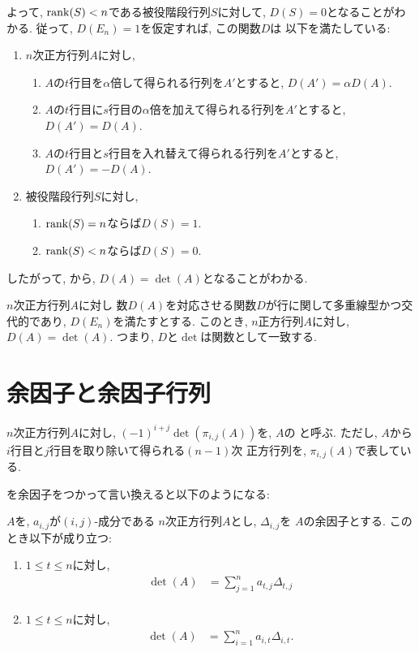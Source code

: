 よって, $\operatorname{rank}(S)<n$である被役階段行列$S$に対して, $D(S)=0$となることがわかる.
従って, $D(E_n)=1$を仮定すれば, この関数$D$は
以下を満たしている:
\begin{enumerate}
  \item $n$次正方行列$A$に対し,
  \begin{enumerate}
  \item 
    $A$の$t$行目を$\alpha$倍して得られる行列を$A'$とすると,
    $D(A')=\alpha D(A)$.
  \item 
    $A$の$t$行目に$s$行目の$\alpha$倍を加えて得られる行列を$A'$とすると,
    $D(A')=D(A)$.
  \item 
    $A$の$t$行目と$s$行目を入れ替えて得られる行列を$A'$とすると,
    $D(A')=-D(A)$.
  \end{enumerate}
  \item 被役階段行列$S$に対し,
  \begin{enumerate}
  \item $\operatorname{rank}(S)=n$ならば$D(S)=1$.
  \item $\operatorname{rank}(S)<n$ならば$D(S)=0$.
  \end{enumerate}
\end{enumerate}
したがって,
から, $D(A)=\det(A)$となることがわかる.
\begin{theorem}
  $n$次正方行列$A$に対し
  数$D(A)$を対応させる関数$D$が行に関して多重線型かつ交代的であり,
  $D(E_n)$を満たすとする.
  このとき,
  $n$正方行列$A$に対し, $D(A)=\det(A)$.
  つまり, $D$と$\det$は関数として一致する.
\end{theorem}

\section{余因子と余因子行列}

\begin{definition}
  $n$次正方行列$A$に対し,
  $(-1)^{i+j}\det(\pi_{i,j}(A))$を,
  $A$の
  と呼ぶ.
  ただし,
  $A$から$i$行目と$j$行目を取り除いて得られる$(n-1)$次
  正方行列を, $\pi_{i,j}(A)$で表している.
\end{definition}
を余因子をつかって言い換えると以下のようになる:
\begin{theorem}
  $A$を,
  $a_{i,j}$が$(i,j)$-成分である
  $n$次正方行列$A$とし,
  $\Delta_{i,j}$を
  $A$の余因子とする.
   このとき以下が成り立つ:
  \begin{enumerate}
  \item
  $1\leq t\leq n$に対し,
    \begin{align*}
      \det(A)&=
      \sum_{j=1}^{n} a_{t,j}\Delta_{t,j}\\
    \end{align*}
  \item
  $1\leq t\leq n$に対し,
    \begin{align*}
      \det(A)&=
      \sum_{i=1}^{n} a_{i,t}\Delta_{i,t}.
    \end{align*}
  \end{enumerate}
\end{theorem}

